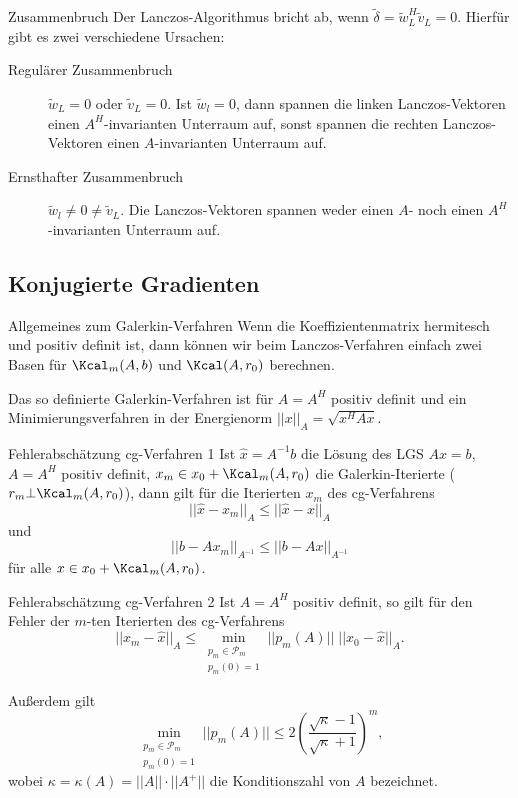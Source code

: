 \begin{karte}{Zusammenbruch}
    Der Lanczos-Algorithmus bricht ab, wenn 
    \( \tilde{\delta} = \tilde{w}_L^H \tilde{v}_L = 0 \). 
    Hierfür gibt es zwei verschiedene Ursachen:
    \begin{description}
        \item[Regulärer Zusammenbruch] \( \tilde{w}_L = 0 \) 
        oder \( \tilde{v}_L = 0\). Ist \( \tilde{w}_l = 0 \), 
        dann spannen die linken Lanczos-Vektoren einen \(A^H\)-invarianten 
        Unterraum auf, sonst spannen die rechten Lanczos-Vektoren einen 
        \(A\)-invarianten Unterraum auf.
        \item[Ernsthafter Zusammenbruch] \( \tilde{w}_l \neq 0 \neq \tilde{v}_L \). 
        Die Lanczos-Vektoren spannen weder einen \(A\)- noch einen \(A^H\)-invarianten 
        Unterraum auf.
    \end{description}
\end{karte}

\subsection{Konjugierte Gradienten}

\begin{karte}{Allgemeines zum Galerkin-Verfahren}
    Wenn die Koeffizientenmatrix hermitesch und 
    positiv definit ist, dann können wir beim Lanczos-Verfahren 
    einfach zwei Basen für \( \Kcal_m(A, b) \) 
    und \( \Kcal(A, r_0) \) berechnen. 

    Das so definierte Galerkin-Verfahren ist für \( A = A^H \)
    positiv definit und ein Minimierungsverfahren in 
    der Energienorm \(||x||_A = \sqrt{x^H Ax}\).
\end{karte}

\begin{karte}{Fehlerabschätzung cg-Verfahren 1}
    Ist \( \widehat{x} = A^{-1}b \) die Lösung 
    des LGS \(Ax=b\), \(A = A^H\) positiv definit, 
    \(x_m \in x_0 + \Kcal_m(A,r_0)\) 
    die Galerkin-Iterierte (\(r_m \bot \Kcal_m(A, r_0)\)),
    dann gilt für die Iterierten \(x_m\) des cg-Verfahrens 
    \[ ||\widehat{x} - x_m||_A \leq ||\widehat{x} - x||_A \]
    und 
    \[ ||b - A x_m||_{A^{-1}} \leq ||b-Ax||_{A^{-1}} \]
    für alle \(x \in x_0 + \Kcal_m(A, r_0)\).
\end{karte}

\begin{karte}{Fehlerabschätzung cg-Verfahren 2}
    Ist \(A = A^H\) positiv definit, so gilt für den Fehler 
    der \(m\)-ten Iterierten des cg-Verfahrens 
    \[ ||x_m - \widehat{x}||_A \leq \min_{\substack{p_m \in \mathcal{P}_m \\ p_m(0) = 1}} 
    ||p_m(A)|| \; ||x_0 - \widehat{x}||_A. \]

    Außerdem gilt 
    \[ \min_{\substack{p_m \in \mathcal{P}_m \\ p_m(0) = 1}} 
    ||p_m(A)|| \leq 2 \left( \frac{\sqrt{\kappa} - 1}{\sqrt{\kappa} + 1} \right)^m, \]
    wobei \(\kappa = \kappa(A) = ||A|| \cdot ||A^+||\) die Konditionszahl von \(A\) bezeichnet.
\end{karte}

